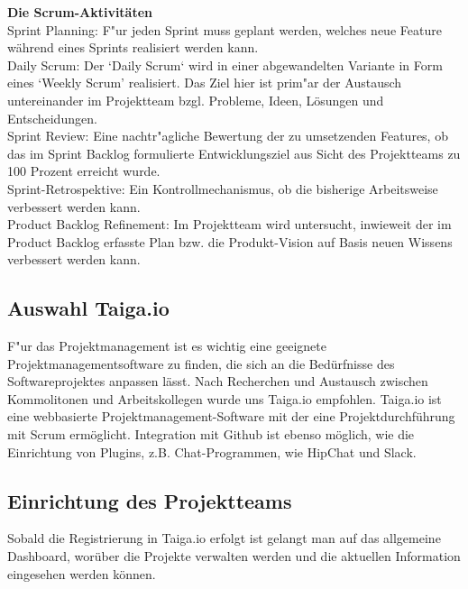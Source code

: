 \documentclass[a4paper, 11pt]{scrreprt}
\begin{document}
\textbf{Die Scrum-Aktivitäten}\\

Sprint Planning: F"ur jeden Sprint muss geplant werden, welches neue Feature während eines Sprints realisiert werden kann.\\

Daily Scrum: Der ‘Daily Scrum‘ wird in einer abgewandelten Variante in Form eines ‘Weekly Scrum’ realisiert. Das Ziel hier ist prim"ar der Austausch untereinander im Projektteam bzgl. Probleme, Ideen, Lösungen und Entscheidungen.\\

Sprint Review: Eine nachtr"agliche Bewertung der zu umsetzenden Features, ob  das im Sprint Backlog formulierte Entwicklungsziel aus Sicht des Projektteams zu 100 Prozent erreicht wurde.\\

Sprint-Retrospektive: Ein Kontrollmechanismus, ob die bisherige Arbeitsweise verbessert werden kann.\\

Product Backlog Refinement: Im Projektteam wird untersucht, inwieweit der im Product Backlog erfasste Plan bzw. die Produkt-Vision auf Basis neuen Wissens verbessert werden kann.


\subsection{Auswahl Taiga.io}

F"ur das Projektmanagement ist es wichtig eine geeignete Projektmanagementsoftware zu finden, die sich an die Bedürfnisse
des Softwareprojektes anpassen lässt. Nach Recherchen und Austausch zwischen Kommolitonen und Arbeitskollegen wurde uns Taiga.io empfohlen. Taiga.io ist eine webbasierte Projektmanagement-Software mit der eine Projektdurchführung mit Scrum
ermöglicht. Integration mit Github ist ebenso möglich, wie die Einrichtung von Plugins, z.B. Chat-Programmen, wie HipChat und Slack.

\subsection{Einrichtung des Projektteams}

Sobald die Registrierung in Taiga.io erfolgt ist gelangt man auf das allgemeine Dashboard, worüber die Projekte verwalten werden und die aktuellen Information eingesehen werden können.\newline
\end{document}
